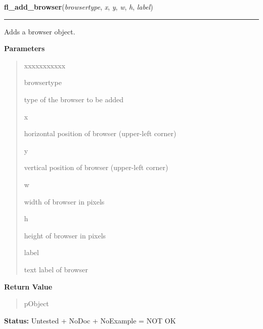     \label{xformslib:library:fl_add_browser}

    \vspace{0.5ex}

\hspace{.8\funcindent}\begin{boxedminipage}{\funcwidth}

    \raggedright \textbf{fl\_add\_browser}(\textit{browsertype}, \textit{x}, \textit{y}, \textit{w}, \textit{h}, \textit{label})

    \vspace{-1.5ex}

    \rule{\textwidth}{0.5\fboxrule}
\setlength{\parskip}{2ex}
    Adds a browser object.

\setlength{\parskip}{1ex}
      \textbf{Parameters}
      \vspace{-1ex}

      \begin{quote}
        \begin{Ventry}{xxxxxxxxxxx}

          \item[browsertype]

          type of the browser to be added

          \item[x]

          horizontal position of browser (upper-left corner)

          \item[y]

          vertical position of browser (upper-left corner)

          \item[w]

          width of browser in pixels

          \item[h]

          height of browser in pixels

          \item[label]

          text label of browser

        \end{Ventry}

      \end{quote}

      \textbf{Return Value}
    \vspace{-1ex}

      \begin{quote}
      pObject

      \end{quote}

\textbf{Status:} Untested + NoDoc + NoExample = NOT OK



    \end{boxedminipage}

